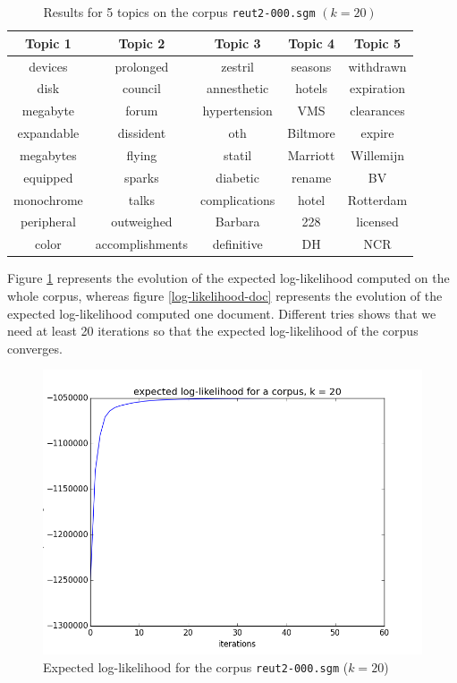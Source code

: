 \documentclass{article}
\begin{document}
\begin{table}[ht!]
\begin{center}
\begin{tabular}{ccccc}
\hline
\textbf{Topic 1} & \textbf{Topic 2} & \textbf{Topic 3}  & \textbf{Topic 4} & \textbf{Topic 5}\\
\hline
devices & prolonged & zestril & seasons & withdrawn \\
disk & council & annesthetic &  hotels & expiration  \\
megabyte & forum & hypertension & VMS & clearances \\
expandable & dissident & oth & Biltmore  & expire \\
megabytes & flying & statil & Marriott & Willemijn \\
equipped &  sparks & diabetic & rename & BV \\
monochrome &talks & complications & hotel & Rotterdam  \\
peripheral & outweighed & Barbara & 228 & licensed \\
color & accomplishments & definitive & DH  & NCR \\
\hline
\end{tabular}
\caption{Results for 5 topics on the corpus \texttt{reut2-000.sgm} $(k=20)$}
\label{voc-result}
\end{center}
\end{table}

Figure \ref{log-likelihood-corpus} represents the evolution of the expected log-likelihood computed on the whole corpus, whereas figure \ref{log-likelihood-doc} represents the evolution of the expected log-likelihood computed one document. Different tries shows that we need at least 20 iterations so that the expected log-likelihood of the corpus converges.

\begin{figure}[ht!]
\begin{center}
\includegraphics[width=0.5\linewidth]{../img/k=20/log_likelihood_corpus_k=20.png}
\caption{Expected log-likelihood for the corpus \texttt{reut2-000.sgm} ($k=20$)}
\label{log-likelihood-corpus}
\end{center}
\end{figure}
\end{document}
